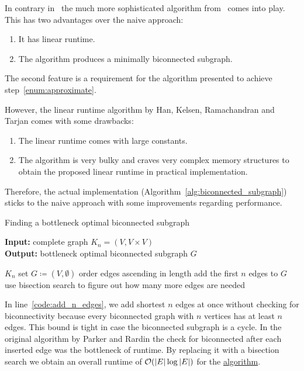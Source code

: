 In contrary in~\cite{alstrup2018hamiltonian} the much more sophisticated algorithm from~\cite{han1995} comes into play. This has two advantages over the naive approach:
\begin{enumerate}
  \item It has linear runtime.
  \item The algorithm produces a minimally biconnected subgraph.
\end{enumerate}
The second feature is a requirement for the algorithm presented to achieve step~\ref{enum:approximate}.

However, the linear runtime algorithm by Han, Kelsen, Ramachandran and Tarjan comes with some drawbacks:
\begin{enumerate}
  \item The linear runtime comes with large constants.
  \item The algorithm is very bulky and craves very complex memory structures to obtain the proposed linear runtime in practical implementation.
\end{enumerate}

Therefore, the actual implementation (Algorithm~\ref{alg:biconnected_subgraph}) sticks to the naive approach with some improvements regarding performance.

\begin{algorithm}[ht!]
  \caption{Finding a bottleneck optimal biconnected subgraph}\label{alg:biconnected_subgraph}
  \textbf{Input:} complete graph \(K_n = (V, V \times V)\)\\
  \textbf{Output:} bottleneck optimal biconnected subgraph \(G\)
  \begin{algorithmic}[1]
     {$K_n$}
      \State set \(G \coloneqq (V, \emptyset)\)
      \State order edges ascending in length
      \State add the first \(n\) edges to \(G\)\label{code:add_n_edges}
      \State use bisection search to figure out how many more edges are needed 
      \State{}
    \EndProcedure
  \end{algorithmic}
\end{algorithm}

In line~\ref{code:add_n_edges}, we add shortest \(n\) edges at once without checking for biconnectivity because every biconnected graph with \(n\) vertices has at least \(n\) edges. This bound is tight in case the biconnected subgraph is a cycle. In the original algorithm by Parker and Rardin the check for biconnected after each inserted edge was the bottleneck of runtime. By replacing it with a bisection search we obtain an overall runtime of \(\mathcal{O}({\vert E \vert}\log {\vert E \vert})\) for the \hyperref[alg:biconnected_subgraph]{algorithm}.

